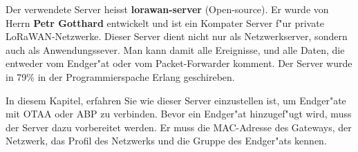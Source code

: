 Der verwendete Server heisst \textbf{lorawan-server} (Open-source). Er wurde von Herrn \textbf{Petr Gotthard} \cite{server} entwickelt und ist ein Kompater Server f"ur private LoRaWAN-Netzwerke. Dieser Server dient nicht nur als Netzwerkserver, sondern auch als Anwendungssever. Man kann damit alle Ereignisse, und alle Daten, die entweder vom Endger"at oder vom Packet-Forwarder komment. Der Server wurde in 79\% in der Programmierspache Erlang \cite{erlang} geschireben.   

In diesem Kapitel, erfahren Sie wie dieser Server einzustellen ist, um Endger"ate mit OTAA oder ABP zu verbinden. Bevor ein Endger"at hinzugef"ugt wird, muss der Server dazu vorbereitet werden. Er muss die MAC-Adresse des Gateways, der Netzwerk, das Profil des Netzwerks und die Gruppe des Endger"ats kennen. 


